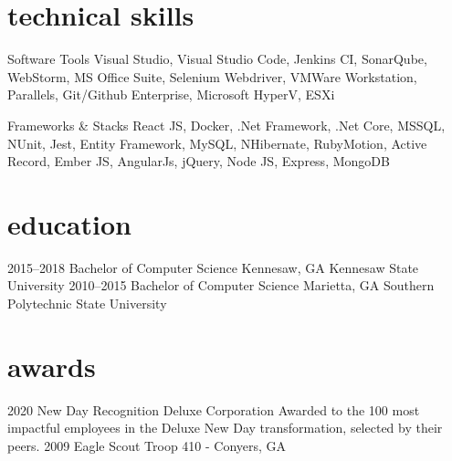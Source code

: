\documentclass[]{friggeri-cv} %
\begin{document}
\section{technical skills}
\begin{entrylist}
\entry
{}
{Software Tools}
{}
{Visual Studio, Visual Studio Code, Jenkins CI, SonarQube, WebStorm, MS Office Suite, 
Selenium Webdriver, VMWare Workstation, Parallels, Git/Github Enterprise, Microsoft HyperV, ESXi}

\entry
{}
{Frameworks \& Stacks}
{}
{React JS, Docker, .Net Framework, .Net Core, MSSQL, NUnit, Jest, Entity Framework, MySQL, NHibernate, 
RubyMotion, Active Record, Ember JS, AngularJs, jQuery, Node JS, Express, MongoDB}
\end{entrylist}


\section{education}

\begin{entrylist}


\entry
{2015--2018}
{Bachelor {\normalfont of Computer Science}}
{Kennesaw, GA}
{Kennesaw State University}
\entry
{2010--2015}
{Bachelor {\normalfont of Computer Science}}
{Marietta, GA}
{Southern Polytechnic State University}

\end{entrylist}

\pagebreak


\section{awards}

\begin{entrylist}


\entry
{2020}
{New Day Recognition}
{Deluxe Corporation}
{Awarded to the 100 most impactful employees in the Deluxe New Day transformation, selected by their peers.}
\entry
{2009}
{Eagle Scout}
{Troop 410 - Conyers, GA}
{}

\end{entrylist}
\end{document}
